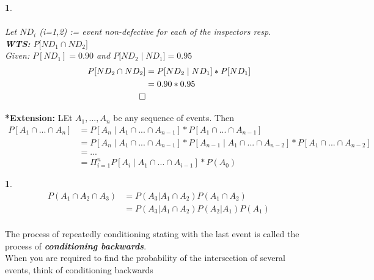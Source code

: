 \documentclass[11pt]{article}
\newtheorem*{solution}{\framebox{Sol}}
\newtheorem{example}{\framebox{Ex}}[section]
\newcommand\tab[1][1cm]{\hspace*{#1}}
\begin{document}
            \begin{solution} \tab 
                \\
                \\Let $ND_i $ (i=1,2) := event non-defective for each of the inspectors resp.\\
                \textbf{WTS:} $P\big[ND_1 \cap ND_2 \big]$ \\
                Given: $P[ND_1] = 0.90$ and $P\big[ND_2 \mid ND_1 \big] = 0.95$ \\
                \begin{align*}
                    P[ND_2 \cap ND_2] &= P[ND_2 \mid ND_1]* P[ND_1] \\
                                        & = 0.90 * 0.95 \\
                \tab \tab \tab \square
                \end{align*}
            \end{solution}
            \textbf{*Extension: } LEt $A_1 , ..., A_n$ be any sequence of events. Then 
            \begin{align*}
                P[A_1 \cap ... \cap A_n] &= P[A_n \mid A_1 \cap ... \cap A_{n-1}]*P[A_1\cap ... \cap A_{n-1}]\\
                                            &= P[A_n \mid A_1 \cap ... \cap A_{n-1}] * P[A_{n-1} \mid A_1 \cap ... \cap A_{n-2}]*P[A_1\cap ... \cap A_{n-2}]\\
                                            &= ...\\
                                            &= \Pi_{i=1}^n P[A_i \mid  A_1 \cap ... \cap A_{i-1}]*P(A_0) \tag{i=1,...,n}
            \end{align*}
            \begin{example}\tab \\
                \begin{align*}
                    P (A_1 \cap A_2 \cap A_3)   &= P(A_3 | A_1 \cap A_2) P(A_1 \cap A_2) \\
                                                &= P(A_3 | A_1 \cap A_2) P(A_2 |A_1) P(A_1) \\
                \end{align*}
            \end{example}
            The process of repeatedly conditioning stating with the last event is called the process of \textbf{\textit{conditioning backwards}}.\\
            When you are required to find the probability of the intersection of several events, think of conditioning backwards
    \newpage
\end{document}
